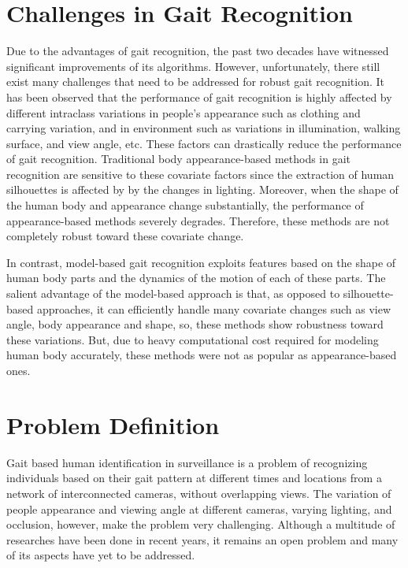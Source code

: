 \section{Challenges in Gait Recognition}
Due to the advantages of gait recognition, the past two decades have witnessed significant improvements of its algorithms. However, unfortunately, there still exist many challenges that need to be addressed for robust gait recognition. It has been observed that the performance of gait recognition is highly affected by different intraclass variations in people's appearance such as clothing and carrying variation, and in environment such as variations in illumination, walking surface, and view angle, etc. These factors can drastically reduce the performance of gait recognition. Traditional body appearance-based methods in gait recognition are sensitive to these covariate factors since the extraction of human silhouettes is affected by by the changes in lighting. Moreover, when the shape of the human body and appearance change substantially, the performance of appearance-based methods severely degrades. Therefore, these methods are not completely robust toward these covariate change.

In contrast, model-based gait recognition exploits features based on the shape of human body parts and the dynamics of the motion of each of these parts. The salient advantage of the model-based approach is that, as  opposed to silhouette-based approaches, it can efficiently handle many covariate changes such as view angle, body appearance and shape, so, these methods show robustness toward these variations. But, due to heavy computational cost required for modeling human body accurately, these methods were not as popular as appearance-based ones. 


\section{Problem Definition}
Gait based human identification in surveillance is a problem of recognizing individuals based on their gait pattern at different times and locations from a network of interconnected cameras, without overlapping views. The variation of people appearance and viewing angle at different cameras, varying lighting, and occlusion, however, make the problem very challenging. Although a multitude of researches have been done in recent years, it remains an open problem and many of its aspects have yet to be addressed.


